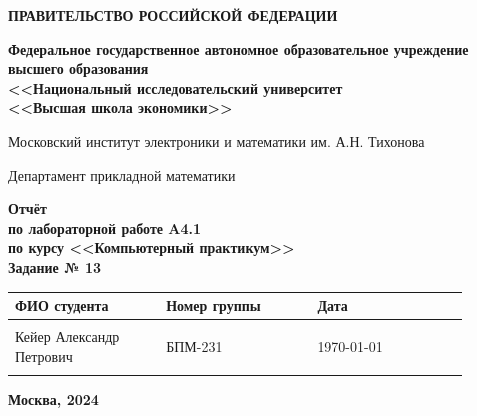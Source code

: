 \documentclass[12pt]{article}
\begin{document}
	
	\thispagestyle{empty}
	\begin{center}
		\textbf{ПРАВИТЕЛЬСТВО РОССИЙСКОЙ ФЕДЕРАЦИИ}
		
		\vspace{5ex}
		
		\textbf{Федеральное государственное автономное образовательное учреждение \\ высшего образования \\ <<Национальный исследовательский университет \\ <<Высшая школа экономики>>}
	\end{center}
	\vspace{5ex}
	
	\begin{center}
		Московский институт электроники и математики им. А.Н. Тихонова  
		
		\vspace{5ex}
		
		Департамент прикладной математики
		
		\vspace{10ex}
		\textbf{Отчёт \\ по лабораторной работе A4.1 \\ по курсу <<Компьютерный практикум>> \\ Задание № 13}
		\vspace{7ex}
		
	\end{center}
	
	\begin{center} 
		\begin{tabular}{| p{0.3\linewidth}| p{0.3\linewidth}| p{0.3\linewidth}|}
			\hline	
			ФИО студента & Номер группы & Дата \\  \hline
			& & \\  
			Кейер Александр \newline Петрович & БПМ-231 & \today \\  
			& & \\  \hline		
		\end{tabular}
	\end{center}
	
	\begin{center}
		\vspace{3ex}
		
		\vfill
		
		\normalsize
		
		\textbf{Москва, 2024}
	\end{center}
	
	\newpage
	
\end{document}
